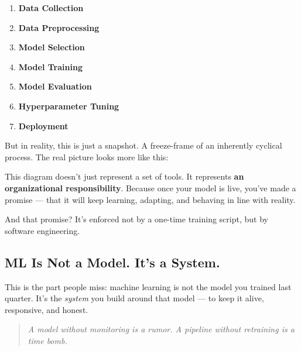 \begin{enumerate}
    \item \textbf{Data Collection}
    \item \textbf{Data Preprocessing}
    \item \textbf{Model Selection}
    \item \textbf{Model Training}
    \item \textbf{Model Evaluation}
    \item \textbf{Hyperparameter Tuning}
    \item \textbf{Deployment}
\end{enumerate}

But in reality, this is just a snapshot. A freeze-frame of an inherently cyclical process. The real picture looks more like this:

\begin{center}
\end{center}

This diagram doesn’t just represent a set of tools. It represents \textbf{an organizational responsibility}. Because once your model is live, you’ve made a promise — that it will keep learning, adapting, and behaving in line with reality.

And that promise? It’s enforced not by a one-time training script, but by software engineering.

\subsection{ML Is Not a Model. It's a System.}

This is the part people miss: machine learning is not the model you trained last quarter. It’s the \textit{system} you build around that model — to keep it alive, responsive, and honest.

\begin{quote}
\textit{A model without monitoring is a rumor. A pipeline without retraining is a time bomb.}
\end{quote}


